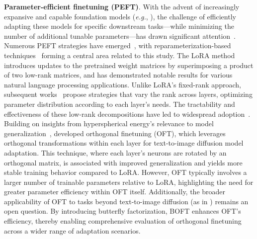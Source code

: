 \textbf{Parameter-efficient finetuning (PEFT)}. With the advent of increasingly expansive and capable foundation models (\emph{e.g.}, \cite{brown2020language,radford2021learning,rombach2022high,kirillov2023segment}), the challenge of efficiently adapting these models for specific downstream tasks—while minimizing the number of additional tunable parameters—has drawn significant attention~\cite{treviso2023efficient,ding2023parameter,lialin2023scaling}. Numerous PEFT strategies have emerged~\cite{houlsby2019parameter,aghajanyan2020intrinsic,hulora2022,edalati2022krona,wang2022adamix,gheini2021cross,zaken2022bitfit,guo2020parameter,sung2021training,ansell2022composable,lester2021power,li2021prefix,vu2022spot,he2021towards,mao2021unipelt,karimi2021compacter,liu2022few,sung2022lst,chen2022parameter,jia2022visual,chen2022adaptformer,zhang2022neural,jie2023fact,lian2022scaling,luo2023towards}, with reparameterization-based techniques~\cite{aghajanyan2020intrinsic,hulora2022,edalati2022krona} forming a central area related to this study. The LoRA method~\cite{hulora2022} introduces updates to the pretrained weight matrices by superimposing a product of two low-rank matrices, and has demonstrated notable results for various natural language processing applications. Unlike LoRA’s fixed-rank approach, subsequent works~\cite{zhang2022adaptive,valipour2022dylora,zhang2023increlora} propose strategies that vary the rank across layers, optimizing parameter distribution according to each layer’s needs. The tractability and effectiveness of these low-rank decompositions have led to widespread adoption~\cite{dettmers2023qlora,zi2023delta,chavan2023one}. Building on insights from hyperspherical energy’s relevance to model generalization~\cite{liu2018learning,liu2021orthogonal}, \cite{qiu2023controlling} developed orthogonal finetuning (OFT), which leverages orthogonal transformations within each layer for text-to-image diffusion model adaptation. This technique, where each layer’s neurons are rotated by an orthogonal matrix, is associated with improved generalization and yields more stable training behavior compared to LoRA. However, OFT typically involves a larger number of trainable parameters relative to LoRA, highlighting the need for greater parameter efficiency within OFT itself. Additionally, the broader applicability of OFT to tasks beyond text-to-image diffusion (as in \cite{qiu2023controlling}) remains an open question. By introducing butterfly factorization, BOFT enhances OFT’s efficiency, thereby enabling comprehensive evaluation of orthogonal finetuning across a wider range of adaptation scenarios.

